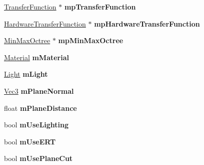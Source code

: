 \begin{DoxyCompactItemize}
\item 
\hypertarget{class_verdi_1_1_render_context_afacb8071476723f0e2e8181ef28cf237}{\hyperlink{class_verdi_1_1_transfer_function}{\-Transfer\-Function} $\ast$ {\bfseries mp\-Transfer\-Function}}\label{class_verdi_1_1_render_context_afacb8071476723f0e2e8181ef28cf237}

\item 
\hypertarget{class_verdi_1_1_render_context_a14de3623dad8d736261e8e6495cca88f}{\hyperlink{class_verdi_1_1_hardware_transfer_function}{\-Hardware\-Transfer\-Function} $\ast$ {\bfseries mp\-Hardware\-Transfer\-Function}}\label{class_verdi_1_1_render_context_a14de3623dad8d736261e8e6495cca88f}

\item 
\hypertarget{class_verdi_1_1_render_context_a2d8c95c89fa225e456e10c486fada455}{\hyperlink{class_verdi_1_1_min_max_octree}{\-Min\-Max\-Octree} $\ast$ {\bfseries mp\-Min\-Max\-Octree}}\label{class_verdi_1_1_render_context_a2d8c95c89fa225e456e10c486fada455}

\item 
\hypertarget{class_verdi_1_1_render_context_a695e8f4fa48e481b5b479de4622096b5}{\hyperlink{class_verdi_1_1_material}{\-Material} {\bfseries m\-Material}}\label{class_verdi_1_1_render_context_a695e8f4fa48e481b5b479de4622096b5}

\item 
\hypertarget{class_verdi_1_1_render_context_aa7fb30a9901110677ef543b34591f18b}{\hyperlink{class_verdi_1_1_light}{\-Light} {\bfseries m\-Light}}\label{class_verdi_1_1_render_context_aa7fb30a9901110677ef543b34591f18b}

\item 
\hypertarget{class_verdi_1_1_render_context_a1fe62611bd86dca38b744e759870884a}{\hyperlink{class_verdi_1_1_vec3}{\-Vec3} {\bfseries m\-Plane\-Normal}}\label{class_verdi_1_1_render_context_a1fe62611bd86dca38b744e759870884a}

\item 
\hypertarget{class_verdi_1_1_render_context_a9419ee42e6a52a86a5e1629aa309f310}{float {\bfseries m\-Plane\-Distance}}\label{class_verdi_1_1_render_context_a9419ee42e6a52a86a5e1629aa309f310}

\item 
\hypertarget{class_verdi_1_1_render_context_aa27808bbf65932211e25b721d46e86d4}{bool {\bfseries m\-Use\-Lighting}}\label{class_verdi_1_1_render_context_aa27808bbf65932211e25b721d46e86d4}

\item 
\hypertarget{class_verdi_1_1_render_context_aab880c24e2f4c5515e703907c44339e2}{bool {\bfseries m\-Use\-E\-R\-T}}\label{class_verdi_1_1_render_context_aab880c24e2f4c5515e703907c44339e2}

\item 
\hypertarget{class_verdi_1_1_render_context_a2b4a96cf21388258c8411e093143544f}{bool {\bfseries m\-Use\-Plane\-Cut}}\label{class_verdi_1_1_render_context_a2b4a96cf21388258c8411e093143544f}

\end{DoxyCompactItemize}


